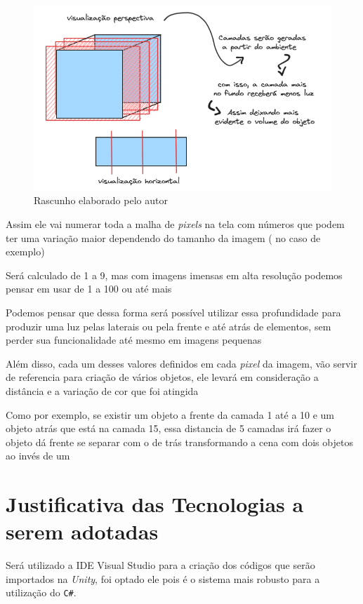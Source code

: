 \FloatBarrier
\begin{figure}[ht]
\caption{Rascunho elaborado pelo autor}
\centering
\includegraphics[scale=0.5]{imagens/Sketch.png}

\label{fig:sketch}
\end{figure}    
\FloatBarrier

Assim ele vai numerar toda a malha de \textit{pixels} na tela com números que podem ter uma variação maior dependendo do tamanho da imagem ( no caso de exemplo)

Será calculado de 1 a 9, mas com imagens imensas em alta resolução podemos pensar em usar de 1 a 100 ou até mais

Podemos pensar que dessa forma será possível utilizar essa profundidade para produzir uma luz pelas laterais ou pela frente e até atrás de elementos, sem perder sua funcionalidade até mesmo em imagens pequenas

Além disso, cada um desses valores definidos em cada \textit{pixel} da imagem, vão servir de referencia para criação de vários objetos, ele levará em consideração a distância e a variação de cor que foi atingida

Como por exemplo, se existir um objeto a frente da camada 1 até a 10 e um objeto atrás que está na camada 15, essa distancia de 5 camadas irá fazer o objeto dá frente se separar com o de trás transformando a cena com dois objetos ao invés de um


\section{Justificativa das Tecnologias a serem adotadas}

Será utilizado a IDE Visual Studio para a criação dos códigos que serão importados na \textit{Unity}, foi optado ele pois é o sistema mais robusto para a utilização do \texttt{C\#}.


